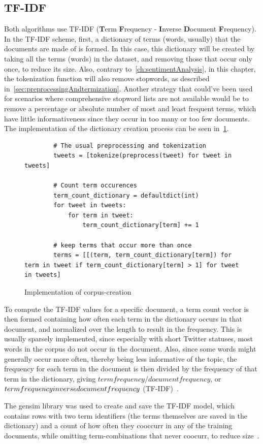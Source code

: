 \subsection{TF-IDF}
\label{subsec:tfidf}

Both algorithms use TF-IDF (\textbf{T}erm \textbf{F}requency - \textbf{I}nverse \textbf{D}ocument \textbf{F}requency).
In the TF-IDF scheme, first, a dictionary of terms (words, usually) that the documents are made of is formed.
In this case, this dictionary will be created by taking all the terms (words) in the dataset,
and removing those that occur only once, to reduce its size.
Also, contrary to~\ref{ch:sentimentAnalysis}, in this chapter,
the tokenization function will also remove stopwords, as described in~\ref{sec:preprocessingAndtermization}.
Another strategy that could've been used for scenarios where comprehensive stopword lists are not available
would be to remove a percentage or absolute number of most and least frequent terms,
which have little informativeness since they occur in too many or too few documents.
The implementation of the dictionary creation process can be seen in~\ref{code:create_corpus}.

\begin{figure}
    \caption{Implementation of corpus-creation}
    \label{code:create_corpus}
    \begin{verbatim}
        # The usual preprocessing and tokenization
        tweets = [tokenize(preprocess(tweet) for tweet in tweets]

        # Count term occurences
        term_count_dictionary = defaultdict(int)
        for tweet in tweets:
            for term in tweet:
                term_count_dictionary[term] += 1

        # keep terms that occur more than once
        terms = [[(term, term_count_dictionary[term]) for term in tweet if term_count_dictionary[term] > 1] for tweet in tweets]
    \end{verbatim}
\end{figure}

\par
To compute the TF-IDF values for a specific document,
a term count vector is then formed containing how often each term in the dictionary occurs in that document,
and normalized over the length to result in the frequency.
This is usually sparsely implemented, since especially with short Twitter statuses,
most words in the corpus do not occur in the document.
Also, since some words might generally occur more often, thereby being less informative of the topic,
the frequency for each term in the document is then divided by the frequency of that term in the dictionary,
giving $term frequency / document frequency$, or $term frequency \* inverse document frequency$ (TF-IDF)~\cite{Blei2003}.
\par
The gensim library was used to create and save the TF-IDF model,
which contains rows with two term identifiers (the terms themselves are saved in the dictionary) and a count of how often
they cooccurr in any of the training documents, while omitting term-combinations that never coocurr, to reduce size~\cite{gensimDocs}.

